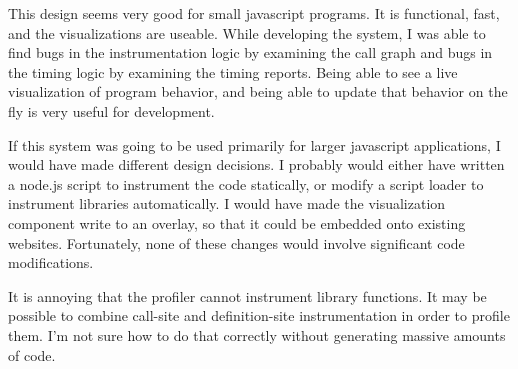 \documentclass{article}
\begin{document}
This design seems very good for small javascript programs. It is functional, fast, and the visualizations are useable. While developing the system, I was able to find bugs in the instrumentation logic by examining the call graph and bugs in the timing logic by examining the timing reports. Being able to see a live visualization of program behavior, and being able to update that behavior on the fly is very useful for development.

If this system was going to be used primarily for larger javascript applications, I would have made different design decisions. I probably would either have written a node.js script to instrument the code statically, or modify a script loader to instrument libraries automatically. I would have made the visualization component write to an overlay, so that it could be embedded onto existing websites. Fortunately, none of these changes would involve significant code modifications.

It is annoying that the profiler cannot instrument library functions. It may be possible to combine call-site and definition-site instrumentation in order to profile them. I'm not sure how to do that correctly without generating massive amounts of code.

{}
\nocite{*}

\end{document}
